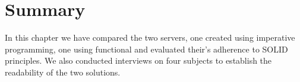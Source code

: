 \section{Summary}\label{resultsummary}

In this chapter we have compared the two servers, one created using imperative
programming, one using functional and evaluated their's adherence to SOLID
principles. We also conducted interviews on four subjects to establish the
readability of the two solutions. 
